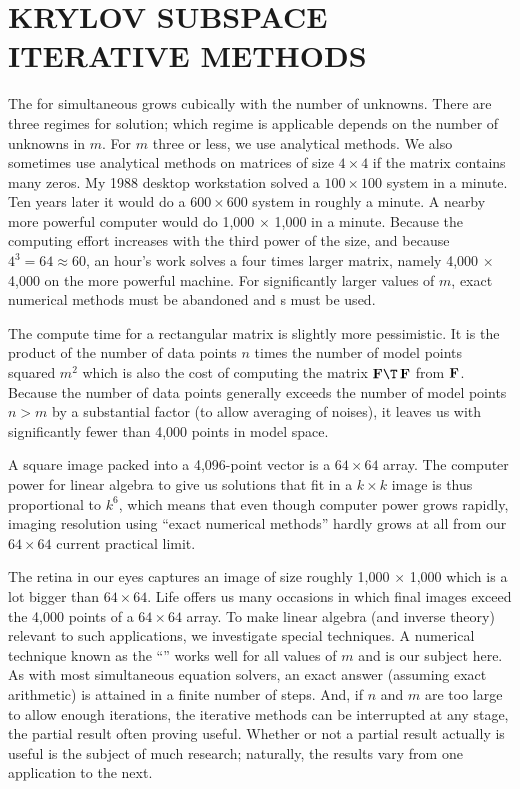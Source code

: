 

\section{KRYLOV SUBSPACE ITERATIVE METHODS}
The  for simultaneous 
grows cubically with the number of unknowns.
There are three regimes for solution;
which regime is applicable
depends on the number of unknowns in $m$.
For $m$ three or less, we use analytical methods.
We also sometimes use analytical methods on matrices of size $4\times 4$
if the matrix contains many zeros.
My 1988 desktop workstation solved a $100 \times 100$
system in a minute.
Ten years later it would do a $600\times 600$ system in roughly a minute.
A nearby more powerful computer would do
1,000 $\times$ 1,000 in a minute.
Because the computing effort increases with the third power of the size,
and because $4^3=64\approx 60$,
an hour's work solves a four times larger matrix,
namely 4,000 $\times$ 4,000 on the more powerful machine.
For significantly larger values of $m$,
exact numerical methods must be abandoned
and s must be used.
\par
The compute time for a rectangular matrix is slightly more pessimistic.
It is the product of the number of data points $n$
times the number of model points squared $m^2$ which is also the cost of computing the matrix
$\bold F\T\,\bold F$ from $\bold F$.
Because the number of data points generally exceeds the number of model
points $n>m$ by a substantial factor
(to allow averaging of noises),
it leaves us with significantly fewer than 4,000 points in model space.
\par
A square image packed into a 4,096-point vector is a $64\times 64$ array.
The computer power for linear algebra to give us solutions that
fit in a $k\times k$ image is thus proportional
to $k^6$, which means that even though computer power grows rapidly,
imaging resolution using ``exact numerical methods'' hardly
grows at all from our $64\times 64$ current practical limit.

\par
The retina in our eyes captures an image of size roughly 1,000 $\times$ 1,000
which is a lot bigger than $64\times 64$.
Life offers us many occasions in which final images exceed the 4,000
points of a $64\times 64$ array.
To make linear algebra (and inverse theory) relevant to such applications,
we investigate special techniques.
A numerical technique known as the
``''
works well for all values of $m$ and is our subject here.
As with most simultaneous equation solvers,
an exact answer (assuming exact arithmetic)
is attained in a finite number of steps.
And, if $n$ and $m$ are too large to allow enough iterations,
the iterative methods can be interrupted at any stage,
the partial result often proving useful.
Whether or not a partial result actually is useful
is the subject of much research;
naturally, the results vary from one application to the next.

